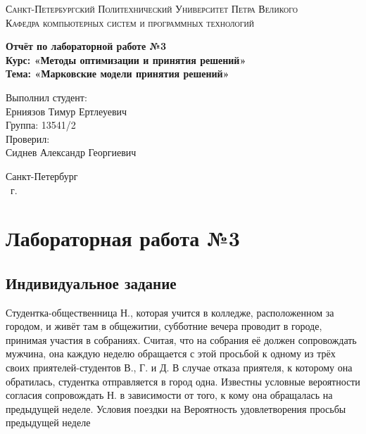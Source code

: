 \documentclass[14pt,a4paper,report]{report}
\begin{document}
\def\contentsname{Содержание}

\begin{titlepage}
	\begin{center}
		\textsc{Санкт-Петербургский Политехнический 
			Университет Петра Великого\\[5mm]
			Кафедра компьютерных систем и программных технологий}
		
		\vfill
		
		\textbf{Отчёт по лабораторной работе №3\\[3mm]
			Курс: «Методы оптимизации и принятия решений»\\[3mm]
			Тема: «Марковские модели принятия решений»\\[35mm]
			}
	\end{center}
	
	\hfill
	\begin{minipage}{.5\textwidth}
		Выполнил студент:\\[2mm] 
		Ерниязов Тимур Ертлеуевич\\
		Группа: 13541/2\\[5mm]
		
		Проверил:\\[2mm] 
		Сиднев Александр Георгиевич
	\end{minipage}
	\vfill
	\begin{center}
		Санкт-Петербург\\ \the\year\ г.
	\end{center}
\end{titlepage}

\tableofcontents
\clearpage

\chapter{Лабораторная работа №3}

\section{Индивидуальное задание}

Студентка-общественница Н., которая учится в колледже, расположенном за городом, и живёт там в общежитии, субботние вечера проводит в городе, принимая участия в собраниях. Считая, что на собрания её должен сопровождать мужчина, она каждую неделю обращается с этой просьбой к одному из трёх своих приятелей-студентов В., Г. и Д. В случае отказа приятеля, к которому она обратилась, студентка отправляется в город одна. Известны условные вероятности согласия сопровождать Н. в зависимости от того, к кому она обращалась на предыдущей неделе. Условия поездки на Вероятность удовлетворения просьбы предыдущей неделе
\end{document}
